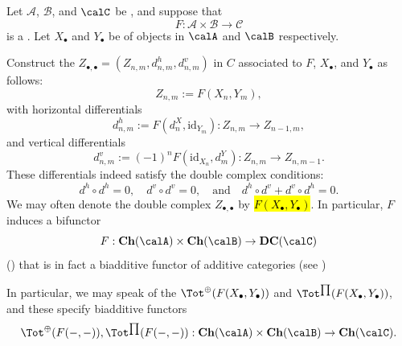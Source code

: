 \begin{definition} \label{definition:double_complex_associated_to_biadditive_functor_and_chain_complexes}
    Let $\mathcal{A}$, $\mathcal{B}$, and $\calC$ be , and suppose that
    $$F : \mathcal{A} \times \mathcal{B} \to \mathcal{C} $$
    is a . Let $X_\bullet$ and $Y_\bullet$ be  of objects in $\calA$ and $\calB$ respectively.

    Construct the  \(Z_{\bullet,\bullet} = (Z_{n,m}, d^h_{n,m}, d^v_{n,m})\) in \(C\) associated to \(F\), \(X_\bullet\), and \(Y_\bullet\) as follows:
    \[ Z_{n,m} := F(X_n, Y_m), \]
    with horizontal differentials
    \[ d^h_{n,m} := F(d^X_n, \mathrm{id}_{Y_m}): Z_{n,m} \to Z_{n-1,m}, \]
    and vertical differentials
    \[ d^v_{n,m} := (-1)^n F(\mathrm{id}_{X_n}, d^Y_m): Z_{n,m} \to Z_{n,m-1}.  \]
    These differentials indeed satisfy the double complex conditions:
    \[ d^h \circ d^h = 0, \quad d^v \circ d^v = 0, \quad \text{and} \quad d^h \circ d^v + d^v \circ d^h = 0.  \]
    We may often denote the double complex $Z_{\bullet,\bullet}$ by \hl{$F(X_\bullet, Y_\bullet)$}. In particular, $F$ induces a bifunctor  
    $$F: \mathbf{Ch}(\calA) \times \mathbf{Ch}(\calB) \to \mathbf{DC}(\calC)$$
    ()
    that is in fact a biadditive functor of additive categories (see ) 

    In particular, we may speak of the  $\Tot^{\oplus}(F(X_\bullet, Y_\bullet))$ and $\Tot^{\prod}(F(X_\bullet, Y_\bullet))$, and these specify biadditive functors
    $$\Tot^{\oplus}(F(-,-)), \Tot^{\prod}(F(-,-)): \mathbf{Ch}(\calA) \times \mathbf{Ch}(\calB) \to \mathbf{Ch}(\calC).$$

\end{definition}